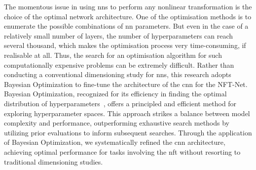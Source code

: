 The momentous issue in using \acrshort{nn}s to perform any nonlinear transformation is the choice of the optimal network architecture. One of the optimisation methods is to enumerate the possible combinations of \acrshort{nn} parameters. But even in the case of a relatively small number of layers, the number of hyperparameters can reach several thousand, which makes the optimisation process very time-consuming, if realisable at all. Thus, the search for an optimisation algorithm for such computationally expensive problems can be extremely difficult. 
Rather than conducting a conventional dimensioning study for \acrshort{nn}s, this research adopts Bayesian Optimization to fine-tune the architecture of the \acrshort{cnn} for the NFT-Net. Bayesian Optimization, recognized for its efficiency in finding the optimal distribution of hyperparameters~\cite{pelikan1999boa}, offers a principled and efficient method for exploring hyperparameter spaces. This approach strikes a balance between model complexity and performance, outperforming exhaustive search methods by utilizing prior evaluations to inform subsequent searches. Through the application of Bayesian Optimization, we systematically refined the \acrshort{cnn} architecture, achieving optimal performance for tasks involving the \acrshort{nft} without resorting to traditional dimensioning studies.



